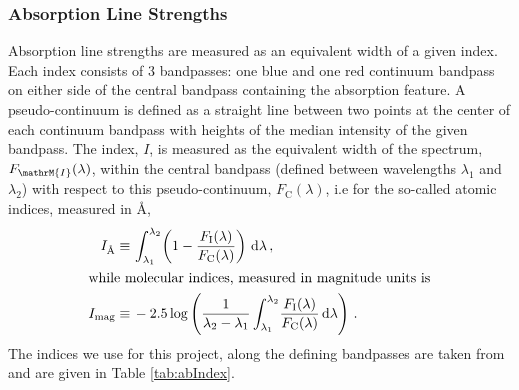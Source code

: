 	 	\subsubsection{Absorption Line Strengths}
	 		\label{subsubsec:Absorption}
	 		Absorption line strengths are measured as an equivalent width of a given index. Each index consists of 3 bandpasses: one blue and one red continuum bandpass on either side of the central bandpass containing the absorption feature. A pseudo-continuum is defined as a straight line between two points at the center of each continuum bandpass with heights of the median intensity of the given bandpass. The index, $I$, is measured as the equivalent width of the spectrum, $F_\mathrM{I}(\lambda)$, within the central bandpass (defined between wavelengths $\lambda_1$ and $\lambda_2$) with respect to this pseudo-continuum, $F_\mathrm{C}(\lambda)$, i.e for the so-called atomic indices, measured in \AA,
	 		\begin{align}
	 			I_\text{\AA} \equiv \, & \int^{\lambda_2}_{\lambda_1} \! \left(1 - \frac{F_\mathrm{I}(\lambda)}{F_\mathrm{C}(\lambda)}\right) \, \mathrm{d}\lambda \, , \\
	 		\intertext{while molecular indices, measured in magnitude units is}
	 			I_\text{mag} \equiv \, & -2.5 \log\left(\frac{1}{\lambda_2 - \lambda_1} \int^{\lambda_2}_{\lambda_1} \! \frac{F_\mathrm{I}(\lambda)}{F_\mathrm{C}(\lambda)} \, \mathrm{d}\lambda\right) \, .
	 		\end{align}
	 		The indices we use for this project, along the defining bandpasses are taken from \citet{Trager1998} and are given in Table \ref{tab:abIndex}.



